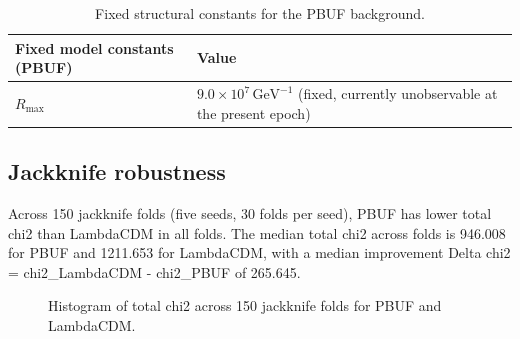 \documentclass[11pt]{article}
\begin{document}
\begin{table}[ht]
\centering
\begin{tabular}{ll}
\toprule
Fixed model constants (PBUF) & Value \\
\midrule
$R_{\max}$ & $9.0\times10^{7}\,\mathrm{GeV}^{-1}$ (fixed, currently unobservable at the present epoch) \\
\bottomrule
\end{tabular}
\caption{Fixed structural constants for the PBUF background.}
\label{tab:fixed_constants}
\end{table}

\begin{table}[ht]
\centering

\caption{chi2 breakdown by dataset for the reference run.\protect\footnotemark[1]}
\label{tab:chi2break}
\end{table}

\clearpage

\subsection{Jackknife robustness}
Across 150 jackknife folds (five seeds, 30 folds per seed), PBUF has lower total chi2 than LambdaCDM in all folds.
The median total chi2 across folds is 946.008 for PBUF and 1211.653 for LambdaCDM, with a median improvement Delta chi2 = chi2\_LambdaCDM - chi2\_PBUF of 265.645.

\jackdata

\begin{figure}[ht]
\centering
{}
\caption{Histogram of total chi2 across 150 jackknife folds for PBUF and LambdaCDM.}
\label{fig:chi2hist}
\end{figure}
\end{document}
